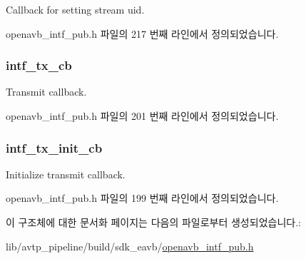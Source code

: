 Callback for setting stream uid. 



openavb\+\_\+intf\+\_\+pub.\+h 파일의 217 번째 라인에서 정의되었습니다.

\subsubsection[{\texorpdfstring{intf\+\_\+tx\+\_\+cb}{intf_tx_cb}}]{ intf\+\_\+tx\+\_\+cb}\hypertarget{structopenavb__intf__cb__t_a697ca0e024c5d38ae52fba581741c255}{}\label{structopenavb__intf__cb__t_a697ca0e024c5d38ae52fba581741c255}


Transmit callback. 



openavb\+\_\+intf\+\_\+pub.\+h 파일의 201 번째 라인에서 정의되었습니다.

\subsubsection[{\texorpdfstring{intf\+\_\+tx\+\_\+init\+\_\+cb}{intf_tx_init_cb}}]{ intf\+\_\+tx\+\_\+init\+\_\+cb}\hypertarget{structopenavb__intf__cb__t_a8c4365e897d7567f363435819ed2c795}{}\label{structopenavb__intf__cb__t_a8c4365e897d7567f363435819ed2c795}


Initialize transmit callback. 



openavb\+\_\+intf\+\_\+pub.\+h 파일의 199 번째 라인에서 정의되었습니다.



이 구조체에 대한 문서화 페이지는 다음의 파일로부터 생성되었습니다.\+:\begin{DoxyCompactItemize}
\item 
lib/avtp\+\_\+pipeline/build/sdk\+\_\+eavb/\hyperlink{build_2sdk__eavb_2openavb__intf__pub_8h}{openavb\+\_\+intf\+\_\+pub.\+h}\end{DoxyCompactItemize}
